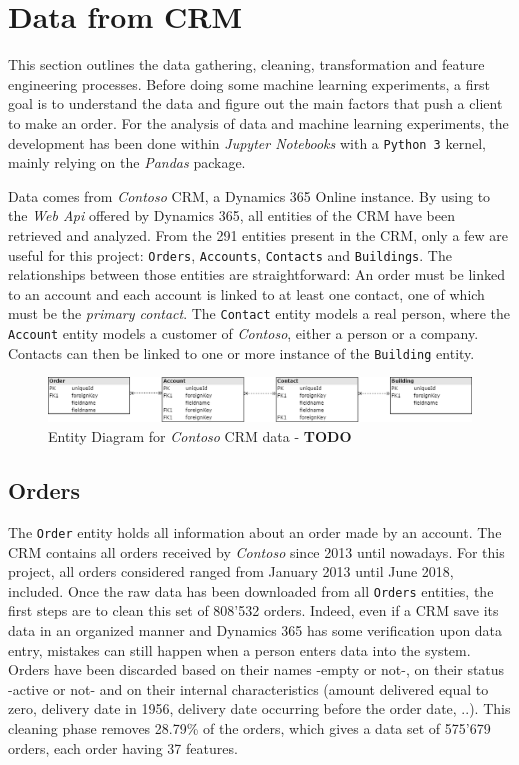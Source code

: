 \section{Data from CRM} \label{sec:crm-data}

This section outlines the data gathering, cleaning, transformation and feature engineering processes. Before doing some machine learning experiments, a first goal is to understand the data and figure out the main factors that push a client to make an order. For the analysis of data and machine learning experiments, the development has been done within \textit{Jupyter Notebooks} with a \texttt{Python 3} kernel, mainly relying on the \textit{Pandas} package.

Data comes from \textit{Contoso} CRM, a Dynamics 365 Online instance. By using to the \textit{Web Api} offered by Dynamics 365, all entities of the CRM have been retrieved and analyzed. From the 291 entities present in the CRM, only a few are useful for this project: \texttt{Orders}, \texttt{Accounts}, \texttt{Contacts} and \texttt{Buildings}. The relationships between those entities are straightforward: An order must be linked to an account and each account is linked to at least one contact, one of which must be the \textit{primary contact}. The \texttt{Contact} entity models a real person, where the \texttt{Account} entity models a customer of \textit{Contoso}, either a person or a company. Contacts can then be linked to one or more instance of the \texttt{Building} entity.

\begin{figure}[h]
    \centering
    \includegraphics[width=15cm]{images/entityDiagram.png}
    \caption{Entity Diagram for \textit{Contoso} CRM data - \textbf{TODO}}
    \label{fig:entity-diagram}
\end{figure}

\subsection{Orders}\label{sec:crm-orders}

The \texttt{Order} entity holds all information about an order made by an account. The CRM contains all orders received by \textit{Contoso} since 2013 until nowadays. For this project, all orders considered ranged from January 2013 until June 2018, included. Once the raw data has been downloaded from all \texttt{Orders} entities, the first steps are to clean this set of 808'532 orders. Indeed, even if a CRM save its data in an organized manner and Dynamics 365 has some verification upon data entry, mistakes can still happen when a person enters data into the system. Orders have been discarded based on their names -empty or not-, on their status -active or not- and on their internal characteristics (amount delivered equal to zero, delivery date in 1956, delivery date occurring before the order date, ..). This cleaning phase removes 28.79\% of the orders, which gives a data set of 575'679 orders, each order having 37 features.

